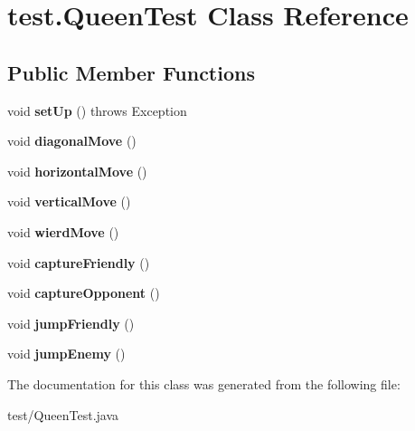 \hypertarget{classtest_1_1QueenTest}{\section{test.\-Queen\-Test Class Reference}
\label{classtest_1_1QueenTest}
}
\subsection*{Public Member Functions}
\begin{DoxyCompactItemize}
\item 
\hypertarget{classtest_1_1QueenTest_a2fd72a88b7be3bdd030673c393b1ba3c}{void {\bfseries set\-Up} ()  throws Exception }\label{classtest_1_1QueenTest_a2fd72a88b7be3bdd030673c393b1ba3c}

\item 
\hypertarget{classtest_1_1QueenTest_ae2e18652724a455899eae0b05488f079}{void {\bfseries diagonal\-Move} ()}\label{classtest_1_1QueenTest_ae2e18652724a455899eae0b05488f079}

\item 
\hypertarget{classtest_1_1QueenTest_a6cc3974c0bc994678b1c87ec31962517}{void {\bfseries horizontal\-Move} ()}\label{classtest_1_1QueenTest_a6cc3974c0bc994678b1c87ec31962517}

\item 
\hypertarget{classtest_1_1QueenTest_ad3cf5a884cc6abf99e95f1c36cfd9d98}{void {\bfseries vertical\-Move} ()}\label{classtest_1_1QueenTest_ad3cf5a884cc6abf99e95f1c36cfd9d98}

\item 
\hypertarget{classtest_1_1QueenTest_a2b4448ad0a46824aeeb8c01d3288a4d7}{void {\bfseries wierd\-Move} ()}\label{classtest_1_1QueenTest_a2b4448ad0a46824aeeb8c01d3288a4d7}

\item 
\hypertarget{classtest_1_1QueenTest_a60628e3cff15dc718bf4a56c0bab1b53}{void {\bfseries capture\-Friendly} ()}\label{classtest_1_1QueenTest_a60628e3cff15dc718bf4a56c0bab1b53}

\item 
\hypertarget{classtest_1_1QueenTest_a0dd5be7a9256654cfa1157040839af9e}{void {\bfseries capture\-Opponent} ()}\label{classtest_1_1QueenTest_a0dd5be7a9256654cfa1157040839af9e}

\item 
\hypertarget{classtest_1_1QueenTest_a6f7a8e2c4eb0417bcbcf12c350e03497}{void {\bfseries jump\-Friendly} ()}\label{classtest_1_1QueenTest_a6f7a8e2c4eb0417bcbcf12c350e03497}

\item 
\hypertarget{classtest_1_1QueenTest_aa9522b9d50934a02503d262ccca33d09}{void {\bfseries jump\-Enemy} ()}\label{classtest_1_1QueenTest_aa9522b9d50934a02503d262ccca33d09}

\end{DoxyCompactItemize}


The documentation for this class was generated from the following file\-:\begin{DoxyCompactItemize}
\item 
test/Queen\-Test.\-java\end{DoxyCompactItemize}
